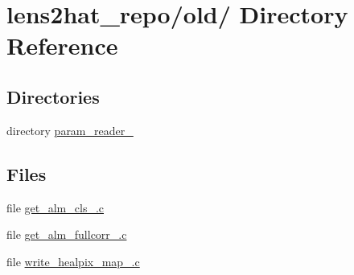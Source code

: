 \section{lens2hat\-\_\-repo/old/ Directory Reference}
\label{dir_ec1fa73d4fce8ec579def042c88b8e19}
\subsection*{Directories}
\begin{DoxyCompactItemize}
\item 
directory \hyperlink{dir_9cba7731df954499ac1d844977df81e3}{param\-\_\-reader\-\_}
\end{DoxyCompactItemize}
\subsection*{Files}
\begin{DoxyCompactItemize}
\item 
file \hyperlink{get__alm__cls__20121302_8c}{get\-\_\-alm\-\_\-cls\-\_.\-c}
\item 
file \hyperlink{get__alm__fullcorr__20120120_8c}{get\-\_\-alm\-\_\-fullcorr\-\_.\-c}
\item 
file \hyperlink{write__healpix__map__20120118_8c}{write\-\_\-healpix\-\_\-map\-\_.\-c}
\end{DoxyCompactItemize}
